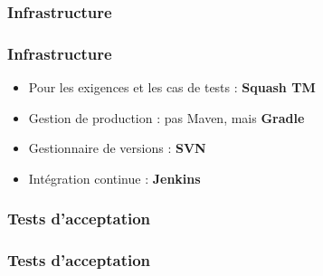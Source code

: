 \documentclass{beamer}
\begin{document}
      \subsubsection{Infrastructure}
      \begin{frame}
        \frametitle{Infrastructure}
        \begin{block}{}
          \begin{itemize}
            \item Pour les exigences et les cas de tests : \textbf{Squash TM}
            \item Gestion de production : pas Maven, mais \textbf{Gradle}
            \item Gestionnaire de versions : \textbf{SVN}
            \item Intégration continue : \textbf{Jenkins}
          \end{itemize}
        \end{block}
      \end{frame}
      
      \subsubsection{Tests d'acceptation}
      \begin{frame}
        \frametitle{Tests d'acceptation}
      \end{frame}
      
\end{document}
